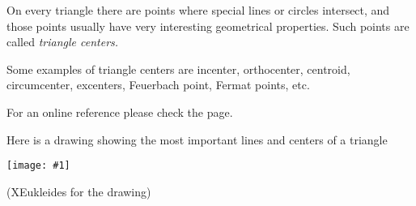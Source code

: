 \documentclass{article}
\newcommand{\figuraex}[2]{\begin{center}\texttt{[image: \#1]}\end{center}}
\begin{document}
On every triangle there are points where special lines or circles intersect, and those points usually have very interesting geometrical properties. Such points are called \emph{triangle centers.}

Some examples of triangle centers are incenter, orthocenter, centroid, circumcenter, excenters, Feuerbach point, Fermat points, etc.

For an online reference please check the
 page.

Here is a drawing showing the most important lines and centers of a triangle
\begin{center}
\figuraex{triangulo-rev}{scale=0.75}
\end{center}
{\footnotesize(XEukleides  for the drawing)}
\end{document}
